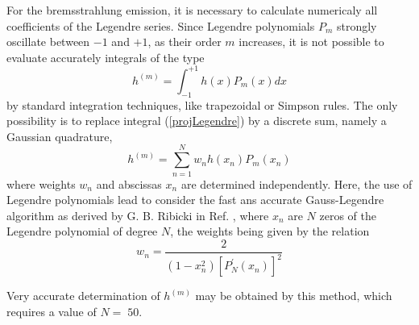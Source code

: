 For the bremsstrahlung emission, it is necessary to calculate numericaly all
coefficients of the Legendre series. Since Legendre polynomials $P_{m}$
strongly oscillate between $-1$ and $+1$, as their order $m$ increases, it is
not possible to evaluate accurately integrals of the type
\begin{equation}
h^{\left(  m\right)  }=\int_{-1}^{+1}h\left(  x\right)  P_{m}\left(  x\right)
dx \label{projLegendre}%
\end{equation}
by standard integration techniques, like trapezoidal or Simpson rules. The
only possibility is to replace integral (\ref{projLegendre}) by a discrete
sum, namely a Gaussian quadrature,
\begin{equation}
h^{\left(  m\right)  }=\sum_{n=1}^{N}w_{n}h\left(  x_{n}\right)  P_{m}\left(
x_{n}\right)
\end{equation}
where weights $w_{n}$ and abscissas $x_{n}$ are determined independently.
Here, the use of Legendre polynomials lead to consider the fast ans accurate
Gauss-Legendre algorithm as derived by G. B. Ribicki in Ref. \cite{pre92},
where $x_{n}$ are $N$ zeros of the Legendre polynomial of degree $N$, the
weights being given by the relation
\begin{equation}
w_{n}=\frac{2}{\left(  1-x_{n}^{2}\right)  \left[  P_{N}^{\prime}\left(
x_{n}\right)  \right]  ^{2}}%
\end{equation}

Very accurate determination of $h^{\left(  m\right)  }$ may be obtained by
this method, which requires a value of $N=\;50$.
